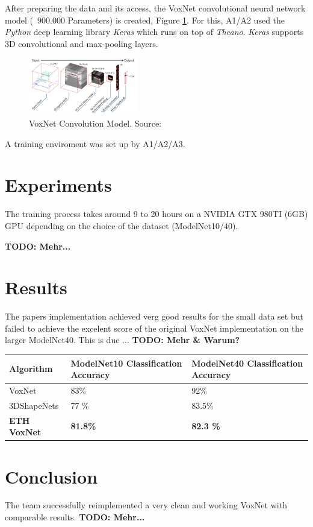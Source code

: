 \documentclass[10pt,twocolumn,letterpaper]{article}
\begin{document}
After preparing the data and its access, the VoxNet convolutional neural network model (~900.000 Parameters) is created, Figure \ref{fig:model}. For this, A1/A2 used the \textit{Python} deep learning library \textit{Keras} which runs on top of \textit{Theano}. \textit{Keras} supports 3D convolutional and max-pooling layers. 

\begin{figure}[h]
	\label{fig:model}
	\centering
	\includegraphics[width=0.42\textwidth]{figures/model}
	\caption{VoxNet Convolution Model. Source: \cite{mature}}
\end{figure}

A training enviroment was set up by A1/A2/A3.

\section{Experiments}

The training process takes around 9 to 20 hours on a NVIDIA GTX 980TI (6GB) GPU depending on the choice of the dataset (ModelNet10/40).

\textbf{TODO: Mehr...}

\section{Results}

The papers implementation achieved verg good results for the small data set but failed to achieve the excelent score of the 
original VoxNet implementation on the larger ModelNet40. 
This is due ... \textbf{TODO: Mehr \& Warum?} \\ 

\begin{tabular}{ |p{2.5cm}||p{2.5cm}|p{2.5cm}|  }
 \hline
 Algorithm & ModelNet10 Classification Accuracy  & ModelNet40 Classification Accuracy \\
 \hline
 VoxNet \cite{maturana_iros_2015}   & 83\% & 92\% \\
 3DShapeNets  \cite{shape}   & 77 \% & 83.5\% \\
\textbf{ETH VoxNet}    & \textbf{81.8\%}   & \textbf{82.3 \%}  \\
 \hline
\end{tabular}

\section{Conclusion}

The team successfully reimplemented a very clean and working VoxNet with comparable results.
\textbf{TODO: Mehr...}

{\small


}
\end{document}
